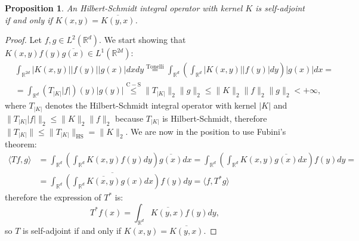 \documentclass[corpo=11pt, stile=classica, tipotesi=custom,
greek, evenboxes, english]{toptesi}
\numberwithin{equation}{chapter}
\newtheorem{prop}[teo]{Proposition}
\theoremstyle{remark}
\newcommand{\R}{\mathbb{R}} %
\begin{document}
\begin{prop}\label{condition integral operator self-adjoint}
	An Hilbert-Schmidt integral operator with kernel $K$ is self-adjoint if and only if $K(x,y) = \overline{K(y,x)}$.
\end{prop}
\begin{proof}
	Let $f,g \in L^2(\R^d)$. We start showing that $K(x,y)f(y)\overline{g(x)} \in L^1(\R^{2d})$:
	\begin{align*}
		&\int_{\R^{2d}} |K(x,y)| |f(y)| |g(x)| dxdy \overset{\mathrm{Tonelli}}{=} \int_{\R^d} \left(\int_{\R^d} |K(x,y)||f(y)| dy\right) |g(x)| dx = \\
		&= \int_{\R^d} (T_{|K|} |f|)(y) |g(y)| \overset{\mathrm{C-S}}{\leq} \|T_{|K|}\|_2 \|g\|_2 \leq \|K\|_2 \| f \|_2 \|g\|_2 < +\infty,
	\end{align*}
	where $T_{|K|}$ denotes the Hilbert-Schmidt integral operator with kernel $|K|$ and $\|T_{|K|}|f|\|_2 \leq \|K\|_2 \| f \|_2$ because $T_{|K|}$ is Hilbert-Schmidt, therefore $\|T_{|K|}\| \leq \|T_{|K|}\|_{\mathrm{HS}} = \| K \|_2$. We are now in the position to use Fubini's theorem:
	\begin{align*}
		\langle Tf,g \rangle &= \int_{\R^d} \left(\int_{\R^d} K(x,y)f(y)dy\right)\overline{g(x)}dx = \int_{\R^d} \left(\int_{\R^d} K(x,y)\overline{g(x)}dx\right) f(y)dy =\\
							 &= \int_{\R^d} \overline{\left(\int_{\R^d} \overline{K(x,y)} g(x)dx\right)} f(y)dy = \langle f,T^*g \rangle
	\end{align*}
	therefore the expression of $T^*$ is:
	\begin{equation*}
		T^*f(x) = \int_{\R^d} \overline{K(y,x)} f(y)dy,
	\end{equation*}
	so $T$ is self-adjoint if and only if $K(x,y) = \overline{K(y,x)}$.
\end{proof}
\end{document}
